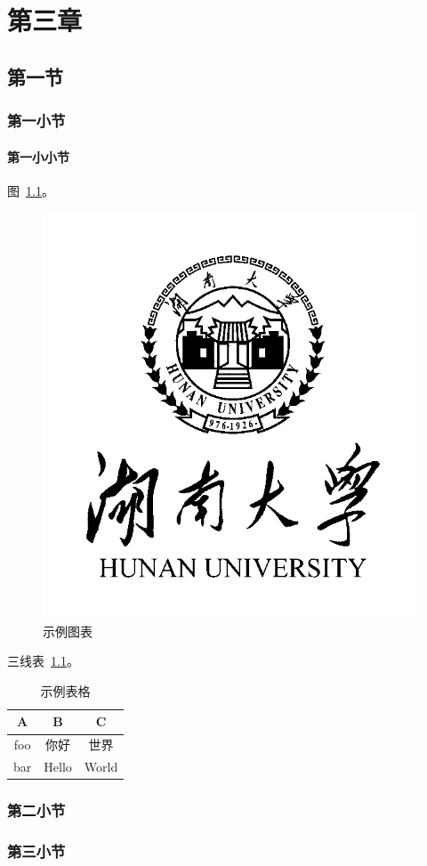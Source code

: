 \chapter{第三章}

\section{第一节}

\subsection{第一小节}

\subsubsection{第一小小节}

图~\ref{fig:demo2}。

\begin{figure}[H]
    \centering
    \includegraphics[width=0.3\linewidth]{figures/hnu-logo.png}
    \caption{示例图表}
    \label{fig:demo2}
\end{figure}

三线表~\ref{table:demo2}。

\begin{table}[H]
    \centering
    \caption{示例表格}
    \label{table:demo2}
    \begin{tabular}{ccc}
        \toprule
        A   & B     & C     \\
        \midrule
        foo & 你好  & 世界  \\
        bar & Hello & World \\
        \bottomrule
    \end{tabular}
\end{table}


\subsection{第二小节}

\subsection{第三小节}

